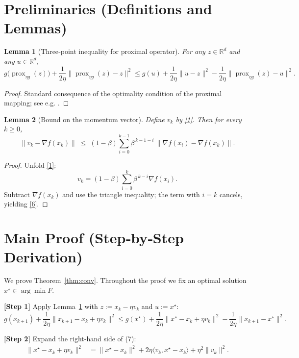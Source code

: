 \documentclass{article}
\newtheorem{lemma}{Lemma}
\newcommand{\prox}{\operatorname{prox}}
\begin{document}
\newpage
\section*{Preliminaries (Definitions and Lemmas)}
\begin{lemma}[Three‑point inequality for proximal operator]\label{lem:prox}
For any $z\in\mathbb{R}^{d}$ and any $u\in\mathbb{R}^{d}$,
\[
g\bigl(\prox_{\eta g}(z)\bigr)+\frac{1}{2\eta}\bigl\|\prox_{\eta g}(z)-z\bigr\|^{2}
\le g(u)+\frac{1}{2\eta}\bigl\|u-z\bigr\|^{2}
-\frac{1}{2\eta}\bigl\|\prox_{\eta g}(z)-u\bigr\|^{2}. \tag{5}
\]
\end{lemma}
\begin{proof}
Standard consequence of the optimality condition of the proximal mapping; see e.g. \cite{parikh2014proximal}.
\end{proof}

\begin{lemma}[Bound on the momentum vector]\label{lem:vg}
Define $v_{k}$ by \eqref{1}. Then for every $k\ge0$,
\[
\|v_{k}-\nabla f(x_{k})\|\;\le\;(1-\beta)\sum_{i=0}^{k-1}\beta^{\,k-1-i}\,\|\nabla f(x_{i})-\nabla f(x_{k})\|. \tag{6}
\]
\end{lemma}
\begin{proof}
Unfold \eqref{1}:
\[
v_{k}= (1-\beta)\sum_{i=0}^{k}\beta^{\,k-i}\nabla f(x_{i}) .
\]
Subtract $\nabla f(x_{k})$ and use the triangle inequality; the term with $i=k$ cancels, yielding \eqref{6}.
\end{proof}

\section*{Main Proof (Step‑by‑Step Derivation)}
We prove Theorem~\ref{thm:conv}. Throughout the proof we fix an optimal solution $x^{\star}\in\arg\min F$.

\noindent\textbf{[Step 1]}  Apply Lemma~\ref{lem:prox} with $z:=x_{k}-\eta v_{k}$ and $u:=x^{\star}$:
\[
g(x_{k+1})+\frac{1}{2\eta}\|x_{k+1}-x_{k}+\eta v_{k}\|^{2}
\le g(x^{\star})+\frac{1}{2\eta}\|x^{\star}-x_{k}+\eta v_{k}\|^{2}
-\frac{1}{2\eta}\|x_{k+1}-x^{\star}\|^{2}. \tag{7}
\]

\noindent\textbf{[Step 2]}  Expand the right‑hand side of (7):
\[
\begin{aligned}
\|x^{\star}-x_{k}+\eta v_{k}\|^{2}
&=\|x^{\star}-x_{k}\|^{2}+2\eta\langle v_{k},x^{\star}-x_{k}\rangle+\eta^{2}\|v_{k}\|^{2}. 
\end{aligned}
\tag{8}
\]
\end{document}
